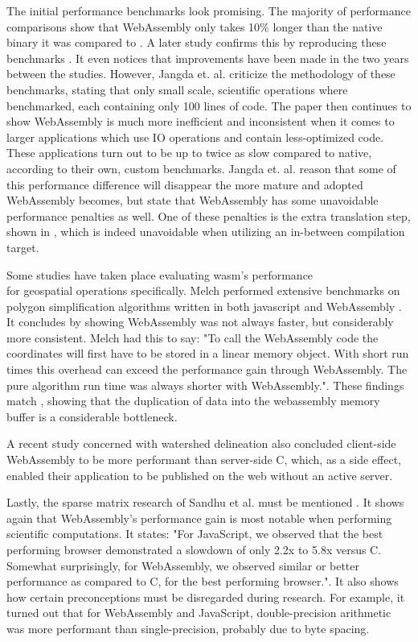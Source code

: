 The initial performance benchmarks look promising. The majority of performance comparisons show that WebAssembly only takes 10\% longer than the native binary it was compared to \citet{haas_bringing_2017}. A later study confirms this by reproducing these benchmarks \citep{jangda_not_2019}. It even notices that improvements have been made in the two years between the studies. However, Jangda et. al. criticize the methodology of these benchmarks, stating that only small scale, scientific operations where benchmarked, each containing only 100 lines of code. The paper then continues to show WebAssembly is much more inefficient and inconsistent when it comes to larger applications which use IO operations and contain less-optimized code. These applications turn out to be up to twice as slow compared to native, according to their own, custom benchmarks. 
Jangda et. al. reason that some of this performance difference will disappear the more mature and adopted WebAssembly becomes, but state that WebAssembly has some unavoidable performance penalties as well. 
One of these penalties is the extra translation step, shown in , which is indeed unavoidable when utilizing an in-between compilation target. 

Some studies have taken place evaluating \ac{wasm}'s performance  \\ for geospatial operations specifically. 
Melch performed extensive benchmarks on polygon simplification algorithms written in both javascript and WebAssembly \citep{melch_performance_2019}. 
It concludes by showing WebAssembly was not always faster, but considerably more consistent. 
Melch had this to say: "To call the WebAssembly code the coordinates will first have to be stored in a linear memory object. 
With short run times this overhead can exceed the performance gain through WebAssembly. 
The pure algorithm run time was always shorter with WebAssembly.". 
These findings match \citet{jangda_not_2019}, showing that the duplication of data into the webassembly memory buffer is a considerable bottleneck.

A recent study concerned with watershed delineation \citep{sit_optimized_2019} also concluded client-side WebAssembly to be more performant than server-side C, which, as a side effect, enabled their application to be published on the web without an active server. 

Lastly, the sparse matrix research of Sandhu et al. must be mentioned \citep{sandhu_sparse_2018}. It shows again that WebAssembly's performance gain is most notable when performing scientific computations. It states: "For JavaScript, we observed that the best performing browser demonstrated a slowdown of only 2.2x to 5.8x versus C. Somewhat surprisingly, for WebAssembly, we observed similar or better performance as compared to C, for the best performing browser.". It also shows how certain preconceptions must be disregarded during research. For example, it turned out that for WebAssembly and JavaScript, double-precision arithmetic was more performant than single-precision, probably due to byte spacing.


